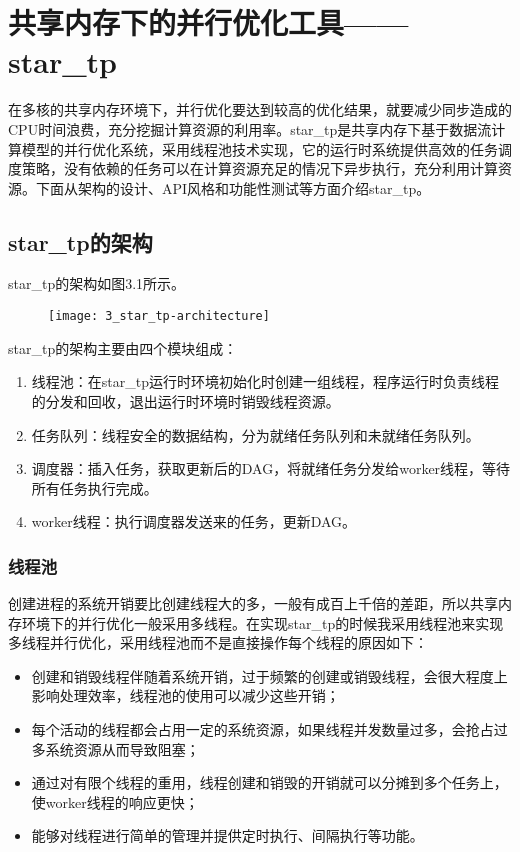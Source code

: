
\chapter{共享内存下的并行优化工具——star\_tp}
\label{chap:startp3}

在多核的共享内存环境下，并行优化要达到较高的优化结果，就要减少同步造成的CPU时间浪费，充分挖掘计算资源的利用率。star\_tp是共享内存下基于数据流计算模型的并行优化系统，采用线程池技术实现，它的运行时系统提供高效的任务调度策略，没有依赖的任务可以在计算资源充足的情况下异步执行，充分利用计算资源。下面从架构的设计、API风格和功能性测试等方面介绍star\_tp。

\section{star\_tp的架构}

star\_tp的架构如图3.1所示。

\begin{figure}[!htbp]
    \centering
    \texttt{[image: 3\_star\_tp-architecture]}
    \label{fig:3_star_tp-architecture}
\end{figure}

star\_tp的架构主要由四个模块组成：

\begin{enumerate}
	\item 线程池：在star\_tp运行时环境初始化时创建一组线程，程序运行时负责线程的分发和回收，退出运行时环境时销毁线程资源。
	\item 任务队列：线程安全的数据结构，分为就绪任务队列和未就绪任务队列。
	\item 调度器：插入任务，获取更新后的DAG，将就绪任务分发给worker线程，等待所有任务执行完成。
	\item worker线程：执行调度器发送来的任务，更新DAG。
\end{enumerate}

\subsection{线程池}

创建进程的系统开销要比创建线程大的多，一般有成百上千倍的差距\citep{Ling:2000:AOT:346152.346320}，所以共享内存环境下的并行优化一般采用多线程。在实现star\_tp的时候我采用线程池来实现多线程并行优化，采用线程池而不是直接操作每个线程的原因如下：

\begin{itemize}
	\item 创建和销毁线程伴随着系统开销，过于频繁的创建或销毁线程，会很大程度上影响处理效率，线程池的使用可以减少这些开销；
	\item 每个活动的线程都会占用一定的系统资源，如果线程并发数量过多，会抢占过多系统资源从而导致阻塞；
	\item 通过对有限个线程的重用，线程创建和销毁的开销就可以分摊到多个任务上，使worker线程的响应更快；
	\item 能够对线程进行简单的管理并提供定时执行、间隔执行等功能。
\end{itemize}

